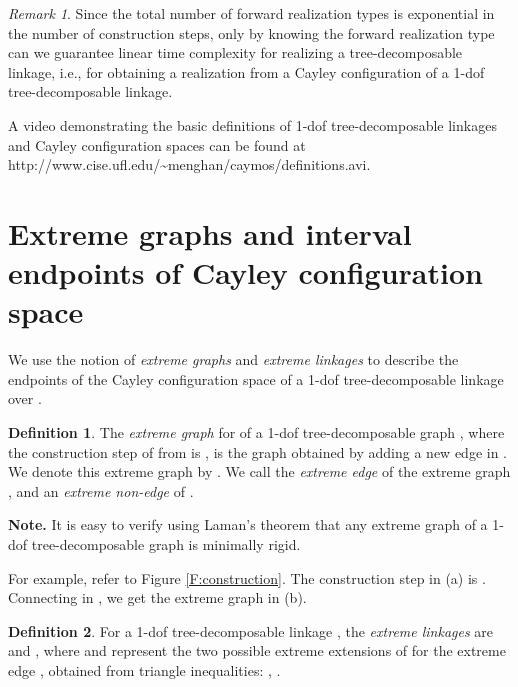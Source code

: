 \documentclass[secthm,amsthm,english]{article}
\theoremstyle{definition}
\newtheorem{definition}{Definition}
\theoremstyle{remark}
\newtheorem{remark}{Remark}
\begin{document}
\begin{remark}
Since the total number of forward realization types is exponential in the number of construction steps,
only by knowing the forward realization type 
can we guarantee linear time complexity for realizing a tree-decomposable linkage, i.e., 
for obtaining a realization from a Cayley configuration of a 1-dof tree-decomposable linkage.
\end{remark}







\medskip
\noindent 
A video demonstrating the basic definitions of 
1-dof tree-decomposable linkages and Cayley configuration spaces 
can be found at http://www.cise.ufl.edu/\~{}menghan/caymos/definitions.avi.



\section{Extreme graphs and interval endpoints of Cayley configuration space}
\label{sec:Combinatorial-interpretation-of}

We use the notion of \emph{extreme graphs} and \emph{extreme linkages}
to describe the endpoints of the Cayley configuration space of a 
1-dof tree-decomposable linkage  over .


\begin{definition} \label{def:extreme-graph}
The  {\emph{extreme graph}}
for  of a 1-dof tree-decomposable graph ,
where the  construction step of  from  is , 
is the  graph obtained by adding a new edge  in . 
We denote this extreme graph by .
We call  the {\emph{extreme edge}} of the extreme graph , 
and an {\emph{extreme non-edge}} of .
\end{definition}

\noindent\textbf{Note.}
It is easy to verify using Laman's theorem \cite{bib:Laman70} that any extreme graph
of a 1-dof tree-decomposable graph is minimally rigid.
\smallskip


For example, refer to Figure \ref{F:construction}. 
The  construction step in (a) is .
Connecting  in , we get the extreme
graph  in (b). 




\begin{definition}\label{def:extreme-linkage}For a 1-dof tree-decomposable linkage ,
the  {\emph{extreme linkages}}\emph{ }are 
and , where  and  represent
the two possible extreme extensions of  for the extreme edge
, obtained from triangle inequalities: 
,
. 
\end{definition}
\end{document}
